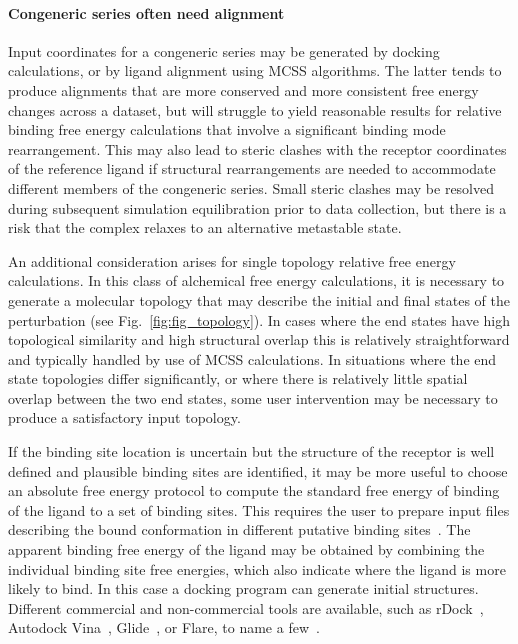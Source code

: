 \documentclass[9pt,bestpractices]{livecoms}
\begin{document}
\paragraph{Congeneric series often need alignment}
Input coordinates for a congeneric series may be generated by docking calculations, or by ligand alignment using MCSS algorithms. The latter tends to produce alignments that are more conserved and more consistent free energy changes across a dataset, but will struggle to yield reasonable results for relative binding free energy calculations that involve a significant binding mode rearrangement. This may also lead to steric clashes with the receptor coordinates of the reference ligand if structural rearrangements are needed to accommodate different members of the congeneric series. Small steric clashes may be resolved during subsequent simulation equilibration prior to data collection, but there is a risk that the complex relaxes to an alternative metastable state. 

An additional consideration arises for single topology relative free energy calculations. In this class of alchemical free energy calculations, it is necessary to generate a molecular topology that may describe the initial and final states of the perturbation (see Fig.~\ref{fig:fig_topology}). In cases where the end states have high topological similarity and high structural overlap this is relatively straightforward and typically handled by use of MCSS calculations. In situations where the end state topologies differ significantly, or where there is relatively little spatial overlap between the two end states, some user intervention may be necessary to produce a satisfactory input topology.

If the binding site location is uncertain but the structure of the receptor is well defined and plausible binding sites are identified, it may be more useful to choose an absolute free energy protocol to compute the standard free energy of binding of the ligand to a set of binding sites. This requires the user to prepare input files describing the bound conformation in different putative binding sites~\cite{evoli2016multiple}. The apparent binding free energy of the ligand may be obtained by combining the individual binding site free energies, which also indicate where the ligand is more likely to bind. In this case a docking program can generate initial structures. Different commercial and non-commercial tools are available, such as rDock~\cite{ruiz-carmona2014rdock}, Autodock Vina~\cite{trott2010autodock}, Glide~\cite{friesner2004glide}, or Flare, to name a few~\cite{kuhn2020assessment}. 
\end{document}
